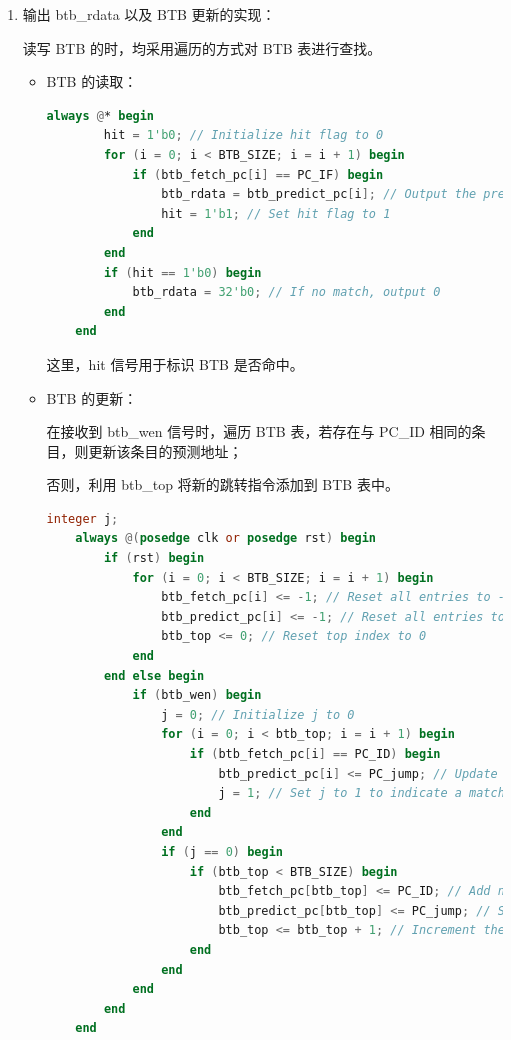 \documentclass{article}
\begin{document}
\begin{enumerate}
    \item 输出 btb\_rdata 以及 BTB 更新的实现：\par
    读写 BTB 的时，均采用遍历的方式对 BTB 表进行查找。\par
    \begin{itemize}
        \item BTB 的读取：\par
        \begin{lstlisting}[language=Verilog]
    always @* begin 
        hit = 1'b0; // Initialize hit flag to 0
        for (i = 0; i < BTB_SIZE; i = i + 1) begin
            if (btb_fetch_pc[i] == PC_IF) begin
                btb_rdata = btb_predict_pc[i]; // Output the predicted PC if a match is found
                hit = 1'b1; // Set hit flag to 1
            end
        end
        if (hit == 1'b0) begin
            btb_rdata = 32'b0; // If no match, output 0
        end
    end
        \end{lstlisting}
        这里，hit 信号用于标识 BTB 是否命中。\par

        \item BTB 的更新：\par
        在接收到 btb\_wen 信号时，遍历 BTB 表，若存在与 PC\_ID 相同的条目，则更新该条目的预测地址；\par
        否则，利用 btb\_top 将新的跳转指令添加到 BTB 表中。\par

        \begin{lstlisting}[language=Verilog]
    integer j;
    always @(posedge clk or posedge rst) begin
        if (rst) begin
            for (i = 0; i < BTB_SIZE; i = i + 1) begin
                btb_fetch_pc[i] <= -1; // Reset all entries to -1
                btb_predict_pc[i] <= -1; // Reset all entries to -1
                btb_top <= 0; // Reset top index to 0
            end
        end else begin
            if (btb_wen) begin
                j = 0; // Initialize j to 0
                for (i = 0; i < btb_top; i = i + 1) begin
                    if (btb_fetch_pc[i] == PC_ID) begin
                        btb_predict_pc[i] <= PC_jump; // Update the predicted PC if a match is found
                        j = 1; // Set j to 1 to indicate a match
                    end
                end
                if (j == 0) begin
                    if (btb_top < BTB_SIZE) begin
                        btb_fetch_pc[btb_top] <= PC_ID; // Add new entry to the BTB
                        btb_predict_pc[btb_top] <= PC_jump; // Set the predicted PC for the new entry
                        btb_top <= btb_top + 1; // Increment the top index
                    end
                end
            end
        end
    end
        \end{lstlisting}
    \end{itemize}
\end{enumerate}
\end{document}
